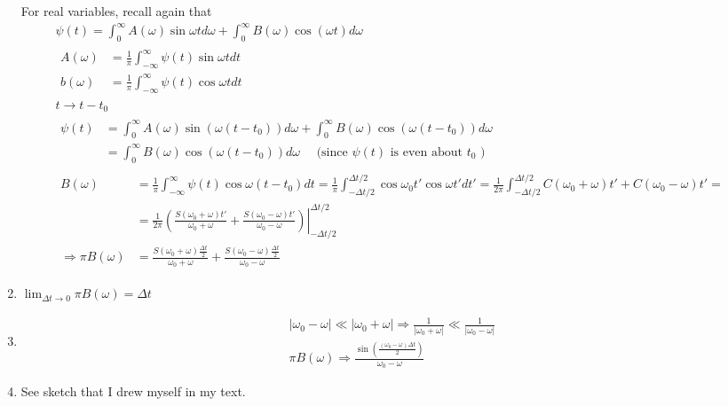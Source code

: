 \documentclass[twoside,10pt]{amsart}
\begin{document}
\begin{enumerate}
For real variables, recall again that
\[
\begin{gathered}
\psi(t) = \int_0^{\infty} A(\omega) \sin{ \omega t} d \omega + \int_0^{\infty} B(\omega) \cos{ (\omega t) } d\omega \\
\begin{aligned}
  A(\omega) & = \frac{1}{\pi} \int_{-\infty}^{\infty} \psi(t) \sin{ \omega t} dt \\
  b(\omega) & = \frac{1}{ \pi} \int_{-\infty}^{\infty} \psi(t) \cos{ \omega t} dt 
\end{aligned}  \\
t \to t- t_0 \\
\begin{aligned}
  \psi(t) & = \int_0^{\infty} A(\omega) \sin{ (\omega (t-t_0) ) } d\omega + \int_0^{\infty} B(\omega) \cos{ (\omega(t-t_0) ) } d\omega \\
  & = \int_0^{\infty} B(\omega) \cos{ (\omega (t-t_0 ) )} d\omega \quad \text{ (since $\psi(t)$ is even about $t_0$ ) } 
\end{aligned} \\
\begin{aligned}
  B(\omega) & = \frac{1}{ \pi} \int_{ -\infty}^{\infty}  \psi(t) \cos{ \omega (t- t_0) } dt = \frac{1}{ \pi } \int_{-\Delta t /2 }^{ \Delta t/2} \cos{ \omega_0 t'} \cos{ \omega t'} dt' = \frac{1}{ 2 \pi } \int_{-\Delta t/2}^{ \Delta t/2} C(\omega_0 + \omega)t' + C(\omega_0 - \omega)t' = \\
  & = \frac{1}{ 2\pi} \left. \left( \frac{ S(\omega_0 + \omega)t' }{ \omega_0 + \omega} + \frac{ S(\omega_0 - \omega)t' }{ \omega_0 - \omega} \right) \right|_{-\Delta t/2}^{\Delta t/2} \\
  \Longrightarrow \pi B(\omega) & = \frac{ S(\omega_0 + \omega) \frac{ \Delta t}{2} }{ \omega_0 + \omega } + \frac{ S(\omega_0 - \omega) \frac{ \Delta t}{2} }{ \omega_0 - \omega } 
\end{aligned}
\end{gathered}
\]
\item $\lim_{\Delta t \to 0} \pi B(\omega) = \Delta t $
\item 
\[
\begin{gathered}
|\omega_0 - \omega| \ll |\omega_0 + \omega | \Longrightarrow \frac{1}{ |\omega_0 + \omega| } \ll \frac{1}{ |\omega_0 - \omega| } \\
\pi B(\omega) \Longrightarrow \frac{ \sin{ \left( \frac{ (\omega_0 - \omega) \Delta t }{2} \right) } }{ \omega_0 - \omega }
\end{gathered}
\]
\item See sketch that I drew myself in my text.  
\end{enumerate}
\end{document}

